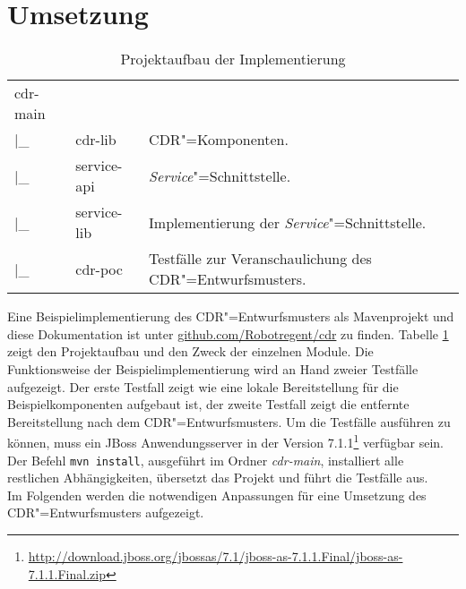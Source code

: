 \section{Umsetzung\label{sec:implementation}}
\begin{table}
\caption{\label{tab:project}Projektaufbau der Implementierung}
\begin{tabular}{lp{2cm}p{8cm}}
cdr-main &             & \\
|\_      & cdr-lib     & \ac{CDR}"=Komponenten.\\
|\_      & service-api & \textit{Service}"=Schnittstelle.\\
|\_      & service-lib & Implementierung der \textit{Service}"=Schnittstelle.\\
|\_      & cdr-poc     & Testfälle zur Veranschaulichung des \ac{CDR}"=Entwurfsmusters.\\
\end{tabular}
\end{table}
Eine Beispielimplementierung des \ac{CDR}"=Entwurfsmusters als Mavenprojekt und diese Dokumentation ist unter \href{https://github.com/Robotregent/cdr}{github.com/Robotregent/cdr} zu finden. 
Tabelle \ref{tab:project} zeigt den Projektaufbau und den Zweck der einzelnen Module.
Die Funktionsweise der Beispielimplementierung wird an Hand zweier Testfälle aufgezeigt. Der erste Testfall zeigt wie eine lokale Bereitstellung für die Beispielkomponenten aufgebaut ist, der zweite Testfall zeigt die entfernte Bereitstellung nach dem \ac{CDR}"=Entwurfsmusters.
Um die Testfälle ausführen zu können, muss ein JBoss Anwendungsserver in der Version 7.1.1\footnote{\href{http://download.jboss.org/jbossas/7.1/jboss-as-7.1.1.Final/jboss-as-7.1.1.Final.zip}{{http://download.jboss.org/jbossas/7.1/jboss-as-7.1.1.Final/jboss-as-7.1.1.Final.zip}}} verfügbar sein.  
Der Befehl \colorbox{mygray}{\lstinline!mvn install!}, ausgeführt im Ordner \textit{cdr-main}, installiert alle restlichen Abhängigkeiten, übersetzt das Projekt und führt die Testfälle aus.\\
Im Folgenden werden die notwendigen Anpassungen für eine Umsetzung des \ac{CDR}"=Entwurfsmusters aufgezeigt.
